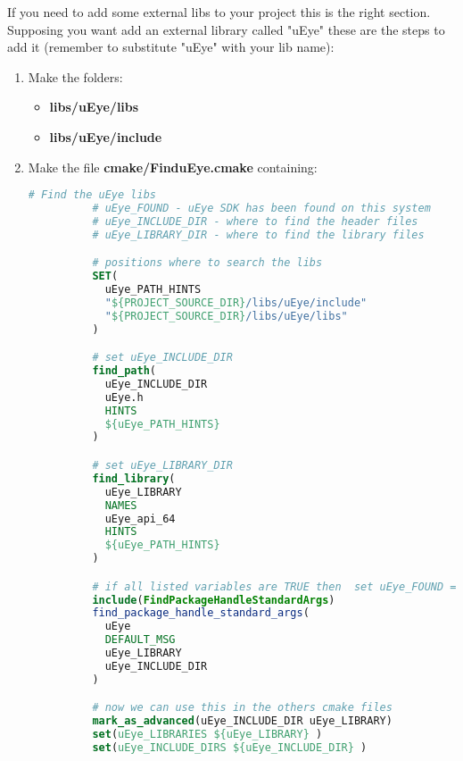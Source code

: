 If you need to add some external libs to your project this is the right
section. Supposing you want add an external library called "uEye" these
are the steps to add it (remember to substitute "uEye" with your lib
name):

\begin{enumerate}
  \def\labelenumi{\arabic{enumi}.}
  \item
        Make the folders:

        \begin{itemize}
          \tightlist
          \item
                \textbf{libs/uEye/libs}
          \item
                \textbf{libs/uEye/include}
        \end{itemize}
  \item
        Make the file \textbf{cmake/FinduEye.cmake} containing:

        \begin{lstlisting}[language=cmake, gobble=10]
          # Find the uEye libs
          # uEye_FOUND - uEye SDK has been found on this system
          # uEye_INCLUDE_DIR - where to find the header files
          # uEye_LIBRARY_DIR - where to find the library files

          # positions where to search the libs
          SET(
            uEye_PATH_HINTS
            "${PROJECT_SOURCE_DIR}/libs/uEye/include"
            "${PROJECT_SOURCE_DIR}/libs/uEye/libs"
          )

          # set uEye_INCLUDE_DIR
          find_path(
            uEye_INCLUDE_DIR
            uEye.h
            HINTS
            ${uEye_PATH_HINTS}
          )

          # set uEye_LIBRARY_DIR
          find_library(
            uEye_LIBRARY
            NAMES
            uEye_api_64
            HINTS
            ${uEye_PATH_HINTS}
          )

          # if all listed variables are TRUE then  set uEye_FOUND = TRUE
          include(FindPackageHandleStandardArgs)
          find_package_handle_standard_args(
            uEye
            DEFAULT_MSG
            uEye_LIBRARY
            uEye_INCLUDE_DIR
          )

          # now we can use this in the others cmake files
          mark_as_advanced(uEye_INCLUDE_DIR uEye_LIBRARY)
          set(uEye_LIBRARIES ${uEye_LIBRARY} )
          set(uEye_INCLUDE_DIRS ${uEye_INCLUDE_DIR} )


\end{lstlisting}
\end{enumerate}
